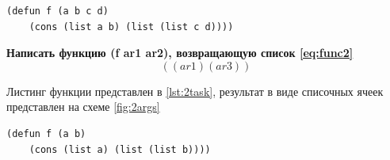 \begin{lstlisting}[style=lispStyle, caption={Представление реализации функции (f ar1 ar2 ar3 ar4).},
                    label={lst:1task}]
(defun f (a b c d)
    (cons (list a b) (list (list c d))))
\end{lstlisting}

\begin{figure}[ht!]
\end{figure}

\textbf{Написать функцию (f ar1 ar2), возвращающую список \ref{eq:func2}}
\begin{equation}
\label{eq:func2}
((ar1)(ar3))
\end{equation}

Листинг функции представлен в \ref{lst:2task}, результат в виде списочных ячеек представлен на схеме \ref{fig:2args}

\begin{lstlisting}[style=lispStyle, caption={Представление реализации функции (f ar1 ar2).},
                    label={lst:2task}]
(defun f (a b)
    (cons (list a) (list (list b))))

\end{lstlisting}

\begin{figure}[ht!]
\end{figure}


